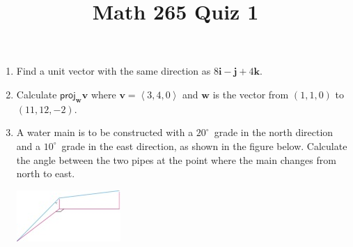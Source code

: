 \documentclass[12pt]{article}
\title{Math 265 Quiz 1}\author{}\date{}
\begin{document}
\maketitle
\thispagestyle{empty}
\begin{enumerate}
\item Find a unit vector with the same direction as
$8\mathbold{i}-\mathbold{j}+4\mathbold{k}$.
\vspace{1in}
\item Calculate $\mathsf{proj}_\mathbold{w}\mathbold{v}$
where $\mathbold{v}=\left\langle 3,4,0\right\rangle$ and
$\mathbold{w}$ is the vector from $\left(1,1,0\right)$
to $\left(11,12,-2\right)$.
\vspace{2in}
\item
A water main is to be constructed with a $20^\circ$~grade in the north
direction and a $10^\circ$~grade in the east direction, as shown in the
figure below. Calculate the angle between the two pipes
at the point where the main changes from north to east.
\vspace{1in}

\hfill\includegraphics{Water}

\end{enumerate}
\end{document}
